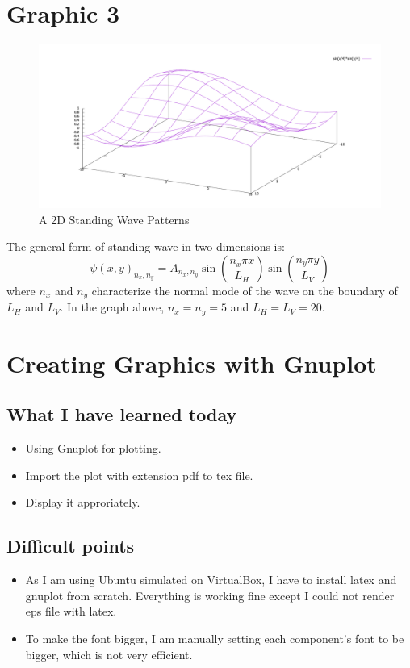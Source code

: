 \documentclass[11pt]{article}
\begin{document}
\section{Graphic 3}
\begin{figure}[H] 
    \begin{center} 
        \includegraphics[scale=0.25]{3} 
    \end{center} 
    \caption{A 2D Standing Wave Patterns} 
\end{figure}
The general form of standing wave in two dimensions is: 
\[\psi(x, y)_{n_{x}, n_{y}}=A_{n_{x}, n_{y}} \sin \left(\frac{n_{x} \pi x}{L_{H}}\right) \sin \left(\frac{n_{y} \pi y}{L_{V}}\right)\]
where $n_x$ and $n_y$ characterize the normal mode of the wave on the boundary of $L_H$ and $L_V$. In the graph above, $n_x=n_y=5$ and $L_H=L_V=20$.

\section{Creating Graphics with Gnuplot}
\subsection{What I have learned today}
\begin{itemize}
    \item Using Gnuplot for plotting.
    \item Import the plot with extension pdf to tex file.
    \item Display it approriately. 
\end{itemize}
\subsection{Difficult points}
\begin{itemize}
    \item As I am using Ubuntu simulated on VirtualBox, I have to install latex and gnuplot from scratch. Everything is working fine except I could not render eps file with latex. 
    \item To make the font bigger, I am manually setting each component's font to be bigger, which is not very efficient.
\end{itemize}
\end{document}
